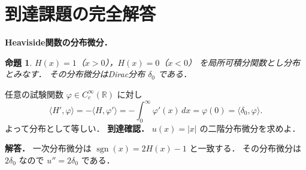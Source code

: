 \documentclass[a5paper,10pt,onecolumn]{jsarticle}
\makeatletter
\theoremstyle{mathnotetheorem}
\newtheorem{proposition}[theorem]{命題}
\renewcommand{\proofname}{証明}
\renewenvironment{proof}[1][\proofname]{%
  \par\pushQED{\qed}\normalfont\topsep4\p@\@plus2\p@\relax
  \trivlist\item[\hskip\labelsep\bfseries #1]\ignorespaces
}{\popQED\endtrivlist\@endpefalse}
\makeatother
\begin{document}
\section{到達課題の完全解答}
\noindent\textbf{Heaviside関数の分布微分．}
\begin{proposition}
$H(x)=1$（$x>0$），$H(x)=0$（$x<0$）
を局所可積分関数とし分布とみなす．
その分布微分はDirac分布 $\delta_0$ である．
\end{proposition}
\begin{proof}
任意の試験関数
$\varphi\in C_c^\infty(\mathbb R)$ に対し
\[
\langle H',\varphi\rangle
=-\langle H,\varphi'\rangle
=-\int_0^\infty\varphi'(x)\,dx
=\varphi(0)
=\langle\delta_0,\varphi\rangle.
\]
よって分布として等しい．
\end{proof}
\noindent\textbf{到達確認．}
$u(x)=|x|$ の二階分布微分を求めよ．
\par\noindent\textbf{解答．}
一次分布微分は
$\operatorname{sgn}(x)=2H(x)-1$ と一致する．
その分布微分は $2\delta_0$ なので
$u''=2\delta_0$ である．
\end{document}
